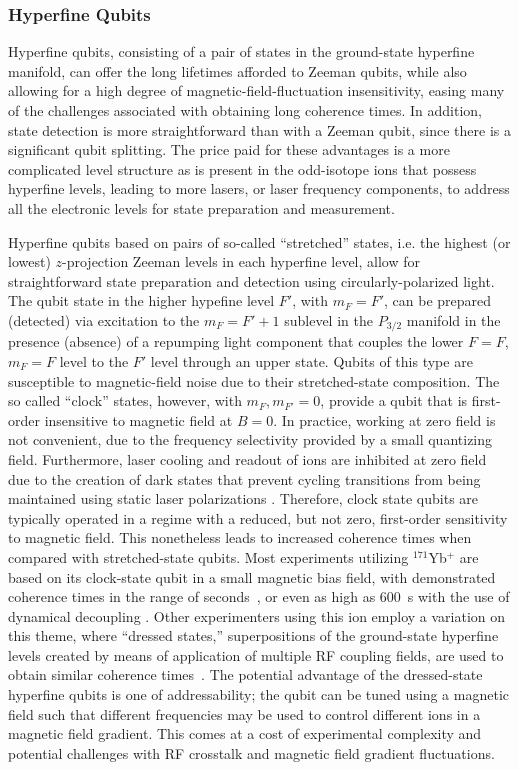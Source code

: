 \documentclass[%
12pt,
 amsmath,amssymb,
]{revtex4-2}
\begin{document}
\subsubsection{Hyperfine Qubits}

Hyperfine qubits, consisting of a pair of states in the ground-state hyperfine manifold, can offer the long lifetimes afforded to Zeeman qubits, while also allowing for a high degree of magnetic-field-fluctuation insensitivity, easing many of the challenges associated with obtaining long coherence times.  In addition, state detection is more straightforward than with a Zeeman qubit, since there is a significant qubit splitting.  The price paid for these advantages is a more complicated level structure as is present in the odd-isotope ions that possess hyperfine levels, leading to more lasers, or laser frequency components, to address all the electronic levels for state preparation and measurement.

Hyperfine qubits based on pairs of so-called ``stretched'' states, i.e. the highest (or lowest) $z$-projection Zeeman levels in each hyperfine level, allow for straightforward state preparation and detection using circularly-polarized light.  The qubit state in the higher hypefine level $F'$, with $m_{F}=F'$, can be prepared (detected) via excitation to the $m_{F}=F'+1$ sublevel in the $P_{3/2}$ manifold in the presence (absence) of a repumping light component that couples the lower $F=F$, $m_{F}=F$ level to the $F'$ level through an upper state.  Qubits of this type are susceptible to magnetic-field noise due to their stretched-state composition.  The so called ``clock'' states, however, with $m_{F},m_{F'}=0$, provide a qubit that is first-order insensitive to magnetic field at $B=0$.  In practice, working at zero field is not convenient, due to the frequency selectivity provided by a small quantizing field.  Furthermore, laser cooling and readout of ions are inhibited at zero field due to the creation of dark states that prevent cycling transitions from being maintained using static laser polarizations \cite{BerkelandDarkStates2002}. Therefore, clock state qubits are typically operated in a regime with a reduced, but not zero, first-order sensitivity to magnetic field.  This nonetheless leads to increased coherence times when compared with stretched-state qubits.  Most experiments utilizing $^{171}$Yb$^{+}$ are based on its clock-state qubit in a small magnetic bias field, with demonstrated coherence times in the range of seconds~\cite{PhysRevA.76.052314}, or even as high as 600~s with the use of dynamical decoupling \cite{Wang10MinuteCoherence2017}.  Other experimenters using this ion employ a variation on this theme, where ``dressed states,'' superpositions of the ground-state hyperfine levels created by means of application of multiple RF coupling fields, are used to obtain similar coherence times~\cite{Timoney2011,PhysRevLett.111.140501}.  The potential advantage of the dressed-state hyperfine qubits is one of addressability; the qubit can be tuned using a magnetic field such that different frequencies may be used to control different ions in a magnetic field gradient.  This comes at a cost of experimental complexity and potential challenges with RF crosstalk and magnetic field gradient fluctuations.
\end{document}
